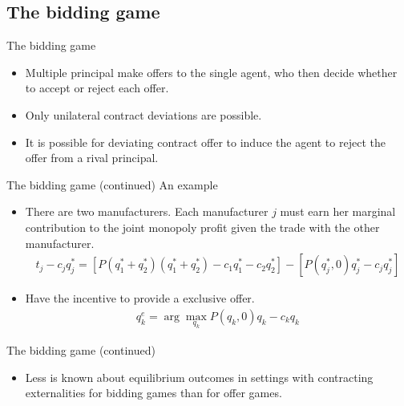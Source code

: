 \documentclass[aspectratio=169]{beamer}  %
\begin{document}
\subsection{The bidding game}
\begin{frame}{The bidding game}
    \begin{itemize}
        \item Multiple principal make offers to the single agent, who then decide whether to accept or reject each offer. \vspace{.2cm}
        \item Only unilateral contract deviations are possible. \vspace{.2cm}
        \item It is possible for deviating contract offer to induce the agent to reject the offer from a rival principal. \vspace{.2cm}
    \end{itemize}
\end{frame}



\begin{frame}{The bidding game (continued)}
    An example \vspace{.2cm}
    \begin{itemize}
        \item There are two manufacturers. Each manufacturer $j$ must earn her marginal contribution to the joint monopoly profit given the trade with the other manufacturer.
        \begin{align}
            t_j - c_j q_j^* = [ P(q_1^* + q_2^*)(q_1^* + q_2^*) - c_1 q_1^* - c_2 q_2^*] - [ P(q_j^*, 0)q_j^* - c_j q_j^*]
        \end{align}
        \item Have the incentive to provide a exclusive offer.
        \begin{align}
            q_k^e = \arg \max_{q_k} P(q_k, 0) q_k - c_k q_k
        \end{align}
    \end{itemize}
\end{frame}



\begin{frame}{The bidding game (continued)}
    \begin{itemize}
        \item Less is known about equilibrium outcomes in settings with contracting externalities for bidding games than for offer games. \vspace{.2cm}
        
    \end{itemize}
\end{frame}
\end{document}
